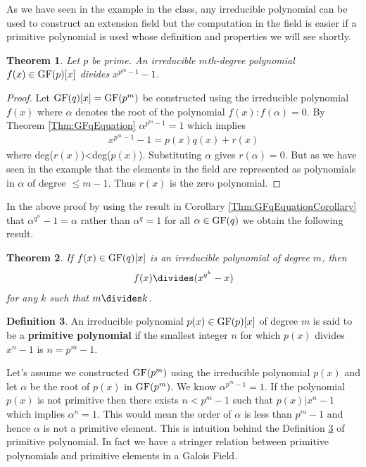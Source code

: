 \documentclass[12pt]{article}
\newtheorem{thm}{Theorem}
\theoremstyle{definition}
\newtheorem{defn}[thm]{Definition}
\begin{document}
As we have seen in the example in the class, any irreducible polynomial can be used to construct an extension field but the computation in the field is easier if a primitive polynomial is used whose definition and properties we will see shortly.

\begin{thm}
Let $p$ be prime. An irreducible $m$th-degree polynomial $f(x)\in\text{GF}(p)[x]$ divides $x^{p^m-1}-1$.
\end{thm}
\begin{proof}
Let $\text{GF}(q)[x]=\text{GF}(p^m)$ be constructed using the irreducible polynomial $f(x)$ where $\alpha$ denotes the root of the polynomial $f(x):f(\alpha)=0.$ By Theorem \ref{Thm:GFqEquation} $\alpha^{p^m-1}=1$ which implies
\begin{align*}
x^{p^m-1}-1=p(x)q(x)+r(x)
\end{align*}
where deg($r(x)$)<deg($p(x)$). Substituting $\alpha$ gives $r(\alpha)=0$. But as we have seen in the example that the elements in the field are represented as polynomials in $\alpha$ of degree $\leq m-1$.   Thus $r(x)$ is the zero polynomial.
\end{proof}
In the above proof by using the result in Corollary \ref{Thm:GFqEquationCorollary} that $\alpha^{q^n}-1=\alpha$ rather than $\alpha^q=1$ for all $\alpha\in \text{GF}(q)$ we obtain the following result.

\begin{thm}
If $f(x)\in\text{GF}(q)[x]$ is an irreducible polynomial of degree $m$, then 
\begin{align*}
f(x)\divides (x^{q^k}-x)
\end{align*}
for any $k$ such that $m\divides k$.
\end{thm}

\begin{defn}
\label{Defn:PrimitivePolynomial}
An irreducible polynomial $p(x)\in\text{GF}(p)[x]$ of degree $m$ is said to be a \textbf{primitive polynomial} if the smallest integer $n$ for which $p(x)$ divides $x^n-1$ is $n=p^m-1.$
\end{defn}
Let's assume we constructed $\text{GF}(p^m)$ using the irreducible polynomial $p(x)$ and let $\alpha$ be the root of $p(x)$ in $\text{GF}(p^m)$. We know $\alpha^{p^m-1}=1$. If the polynomial $p(x)$ is not primitive then there exists $n<p^m-1$ such that $p(x)|x^n-1$ which implies $\alpha^n=1$. This would mean the order of $\alpha$ is less than $p^m-1$ and hence $\alpha $  is not a primitive element. This is intuition behind the Definition \ref{Defn:PrimitivePolynomial} of primitive polynomial. In fact we have a stringer relation between primitive polynomials and primitive elements in a Galois Field.
\end{document}
